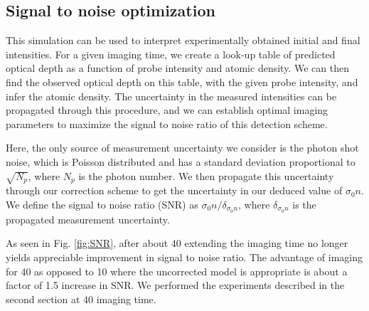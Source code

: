 \documentclass[12pt]{iopart}
\begin{document}
\subsection{Signal to noise optimization}
This simulation can be used to interpret experimentally obtained initial and final intensities. For a given imaging time, we create a look-up table of predicted optical depth as a function of probe intensity and atomic density. We can then find the observed optical depth on this table, with the given probe intensity, and infer the atomic density. The uncertainty in the measured intensities can be propagated through this procedure, and we can establish optimal imaging parameters to maximize the signal to noise ratio of this detection scheme. 
\par Here, the only source of measurement uncertainty we consider is the photon shot noise, which is Poisson distributed and has a standard deviation proportional to $\sqrt{N_p}$, where $N_p$ is the photon number. We then propagate this uncertainty through our correction scheme to get the uncertainty in our deduced value of $\sigma_0 n$. We define the signal to noise ratio (SNR) as $\sigma_0 n/\delta_{\sigma_0 n}$, where $ \delta_{\sigma_0 n}$ is the propagated measurement uncertainty.
\par As seen in Fig. \ref{fig:SNR}, after about 40\us{} extending the imaging time no longer yields appreciable improvement in signal to noise ratio. The advantage of imaging for 40\us{} as opposed to 10\us{} where the uncorrected model is appropriate is about a factor of  1.5 increase in SNR. We performed the experiments described in the second section at 40\us{} imaging time.
\end{document}
